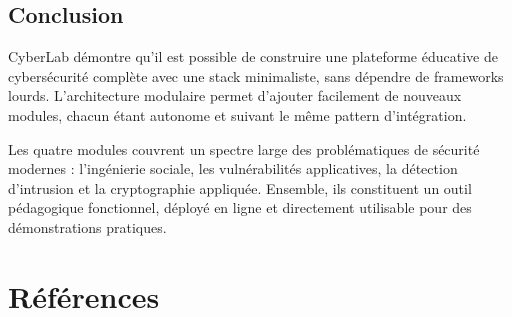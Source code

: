 \documentclass[12pt,a4paper]{report}
\begin{document}
\section{Conclusion}

CyberLab démontre qu'il est possible de construire une plateforme
éducative de cybersécurité complète avec une stack minimaliste,
sans dépendre de frameworks lourds. L'architecture modulaire permet
d'ajouter facilement de nouveaux modules, chacun étant autonome et
suivant le même pattern d'intégration.

Les quatre modules couvrent un spectre large des problématiques de
sécurité modernes : l'ingénierie sociale, les vulnérabilités
applicatives, la détection d'intrusion et la cryptographie appliquée.
Ensemble, ils constituent un outil pédagogique fonctionnel, déployé
en ligne et directement utilisable pour des démonstrations pratiques.

\chapter*{Références}
\end{document}
